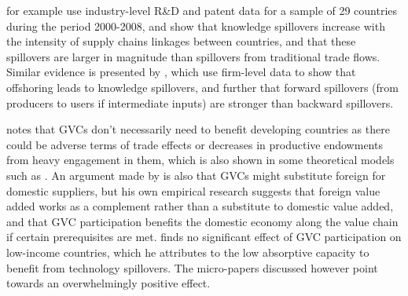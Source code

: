\documentclass[a4paper]{article}
\begin{document}
\citet{piermartini2014knowledge} for example use industry-level R\&D and patent data for a sample of 29 countries during the period 2000-2008, and show that knowledge spillovers increase with the intensity of supply chains linkages between countries, and that these spillovers are larger in magnitude than spillovers from traditional trade flows. Similar evidence is presented by \citet{benz2015trade}, which use firm-level data to show that offshoring leads to knowledge spillovers, and further that forward spillovers (from producers to users if intermediate inputs) are stronger than backward spillovers. \newline

\citet{Kummritz20161} notes that GVCs don't necessarily need to benefit developing countries as there could be adverse terms of trade effects or decreases in productive endowments from heavy engagement in them, which is also shown in some theoretical models such as \citet{baldwin2014trade}. An argument made by \citet{kummritz2015global} is also that GVCs might substitute foreign for domestic suppliers, but his own empirical research suggests that 
foreign value added works as a complement rather than a substitute to domestic value added, and that GVC participation benefits the domestic economy along the value chain if certain prerequisites are met.  \citet{kummritz2015global} finds no significant effect of GVC participation on low-income countries, which he attributes to the low absorptive capacity to benefit from technology spillovers. The micro-papers discussed however point towards an overwhelmingly positive effect. \newline




\end{document}
